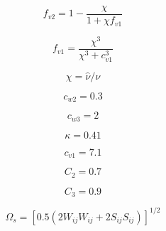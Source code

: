 {\newpage\clearpage
{}%
\begin{displaymath}
f_{v2} = 1 - \frac{\chi}{1 + \chi f_{v1}}
\end{displaymath}%
\lthtmldisplayZ
\lthtmlcheckvsize\clearpage}

{\newpage\clearpage
{}%
\begin{displaymath}
f_{v1} = \frac{\chi^3}{\chi^3 + c_{v1}^3}
\end{displaymath}%
\lthtmldisplayZ
\lthtmlcheckvsize\clearpage}

{\newpage\clearpage
{}%
\begin{displaymath}
\chi = \hat \nu / \nu
\end{displaymath}%
\lthtmldisplayZ
\lthtmlcheckvsize\clearpage}

{\newpage\clearpage
{}%
\begin{displaymath}
c_{w2}=0.3
\end{displaymath}%
\lthtmldisplayZ
\lthtmlcheckvsize\clearpage}

{\newpage\clearpage
{}%
\begin{displaymath}
c_{w3}=2
\end{displaymath}%
\lthtmldisplayZ
\lthtmlcheckvsize\clearpage}

{\newpage\clearpage
{}%
\begin{displaymath}
\kappa=0.41
\end{displaymath}%
\lthtmldisplayZ
\lthtmlcheckvsize\clearpage}

{\newpage\clearpage
{}%
\begin{displaymath}
c_{v1}=7.1
\end{displaymath}%
\lthtmldisplayZ
\lthtmlcheckvsize\clearpage}

{\newpage\clearpage
{}%
\begin{displaymath}
C_2=0.7
\end{displaymath}%
\lthtmldisplayZ
\lthtmlcheckvsize\clearpage}

{\newpage\clearpage
{}%
\begin{displaymath}
C_3=0.9
\end{displaymath}%
\lthtmldisplayZ
\lthtmlcheckvsize\clearpage}

{\newpage\clearpage
{}%
\begin{displaymath}
\Omega_s = [0.5(2 W_{ij}W_{ij}+2 S_{ij}S_{ij})]^{1/2}
\end{displaymath}%
\lthtmldisplayZ
\lthtmlcheckvsize\clearpage}


